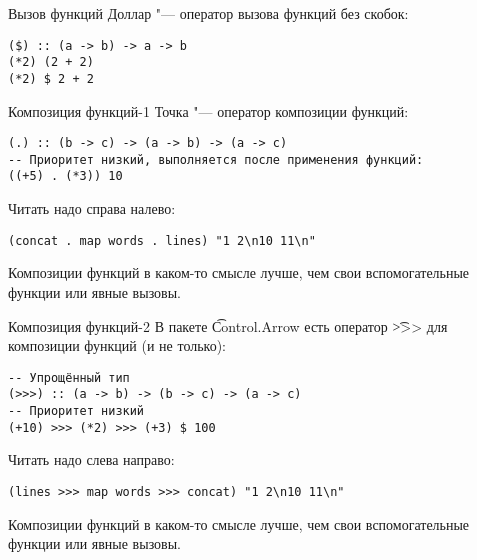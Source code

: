 \begin{frame}[fragile]{Вызов функций}
	Доллар "--- оператор вызова функций без скобок:
\begin{verbatim}
($) :: (a -> b) -> a -> b
(*2) (2 + 2)
(*2) $ 2 + 2
\end{verbatim}
\end{frame}

\begin{frame}[fragile]{Композиция функций-1}
	Точка "--- оператор композиции функций:
\begin{verbatim}
(.) :: (b -> c) -> (a -> b) -> (a -> c)
-- Приоритет низкий, выполняется после применения функций:
((+5) . (*3)) 10
\end{verbatim}
	Читать надо справа налево:
\begin{verbatim}
(concat . map words . lines) "1 2\n10 11\n"
\end{verbatim}
	Композиции функций в каком-то смысле лучше, чем свои вспомогательные функции или явные вызовы.
\end{frame}

\begin{frame}[fragile]{Композиция функций-2}
	В пакете \t{Control.Arrow} есть оператор \t{>>>} для композиции функций (и не только):
\begin{verbatim}
-- Упрощённый тип
(>>>) :: (a -> b) -> (b -> c) -> (a -> c)
-- Приоритет низкий
(+10) >>> (*2) >>> (+3) $ 100
\end{verbatim}
	Читать надо слева направо:
\begin{verbatim}
(lines >>> map words >>> concat) "1 2\n10 11\n"
\end{verbatim}
	Композиции функций в каком-то смысле лучше, чем свои вспомогательные функции или явные вызовы.
\end{frame}
